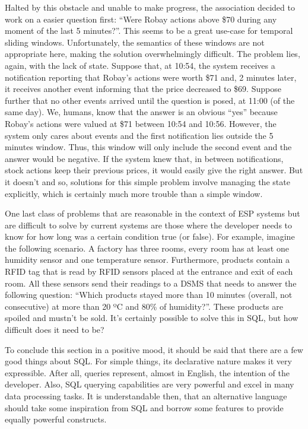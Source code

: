 \documentclass{report}
\begin{document}
Halted by this obstacle and unable to make progress, the association
decided to work on a easier question first: ``Were Robay actions above
\$70 during any moment of the last 5 minutes?''. This seems to be a
great use-case for temporal sliding windows. Unfortunately, the
semantics of these windows are not appropriate here, making the
solution overwhelmingly difficult. The problem lies, again, with the
lack of state. Suppose that, at 10:54, the system receives a
notification reporting that Robay's actions were worth \$71 and, 2
minutes later, it receives another event informing that the price
decreased to \$69. Suppose further that no other events arrived until
the question is posed, at 11:00 (of the same day). We, humans, know
that the answer is an obvious ``yes'' because Robay's actions were
valued at \$71 between 10:54 and 10:56. However, the system only cares
about events and the first notification lies outside the 5 minutes
window. Thus, this window will only include the second event and the
answer would be negative. If the system knew that, in between
notifications, stock actions keep their previous prices, it would
easily give the right answer. But it doesn't and so, solutions for
this simple problem involve managing the state explicitly, which is
certainly much more trouble than a simple window.

One last class of problems that are reasonable in the context of ESP
systems but are difficult to solve by current systems are those where
the developer needs to know for how long was a certain condition true
(or false). For example, imagine the following scenario. A factory has
three rooms, every room has at least one humidity sensor and one
temperature sensor. Furthermore, products contain a RFID tag that is
read by RFID sensors placed at the entrance and exit of each room. All
these sensors send their readings to a DSMS that needs to answer the
following question: ``Which products stayed more than 10 minutes
(overall, not consecutive) at more than 20 ºC and 80\% of
humidity?''. These products are spoiled and mustn't be sold. It's
certainly possible to solve this in SQL, but how difficult does it
need to be?

To conclude this section in a positive mood, it should be said that
there are a few good things about SQL. For simple things, its
declarative nature makes it very expressible. After all, queries
represent, almost in English, the intention of the developer. Also,
SQL querying capabilities are very powerful and excel in many data
processing tasks. It is understandable then, that an alternative
language should take some inspiration from SQL and borrow some
features to provide equally powerful constructs.
\end{document}
